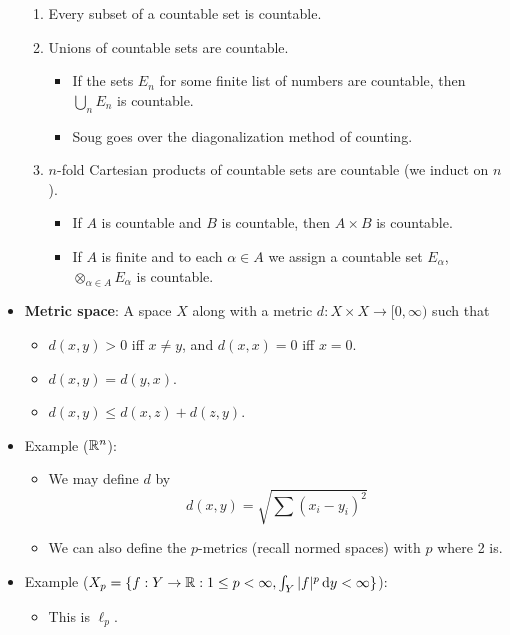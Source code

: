 \documentclass[../../notes.tex]{subfiles}
\begin{document}
\begin{itemize}
    \begin{enumerate}
        \item Every subset of a countable set is countable.
        \item Unions of countable sets are countable.
        \begin{itemize}
            \item If the sets $E_n$ for some finite list of numbers are countable, then $\bigcup_nE_n$ is countable.
            \item Soug goes over the diagonalization method of counting.
        \end{itemize}
        \item $n$-fold Cartesian products of countable sets are countable (we induct on $n$).
        \begin{itemize}
            \item If $A$ is countable and $B$ is countable, then $A\times B$ is countable.
            \item If $A$ is finite and to each $\alpha\in A$ we assign a countable set $E_\alpha$, $\otimes_{\alpha\in A}E_\alpha$ is countable.
        \end{itemize}
    \end{enumerate}
    \item \textbf{Metric space}: A space $X$ along with a metric $d:X\times X\to[0,\infty)$ such that
    \begin{itemize}
        \item $d(x,y)>0$ iff $x\neq y$, and $d(x,x)=0$ iff $x=0$.
        \item $d(x,y)=d(y,x)$.
        \item $d(x,y)\leq d(x,z)+d(z,y)$.
    \end{itemize}
    \item Example ($\mathbb{R}^n$):
    \begin{itemize}
        \item We may define $d$ by
        \begin{equation*}
            d(x,y) = \sqrt{\sum(x_i-y_i)^2}
        \end{equation*}
        \item We can also define the $p$-metrics (recall normed spaces) with $p$ where 2 is.
    \end{itemize}
    \item Example ($X_p=\{f:Y\to\mathbb{R}:1\leq p<\infty,\int_Y|f|^p\dd{y}<\infty\}$):
    \begin{itemize}
        \item This is $\ell_p$.

\end{itemize}
\end{itemize}
\end{document}
